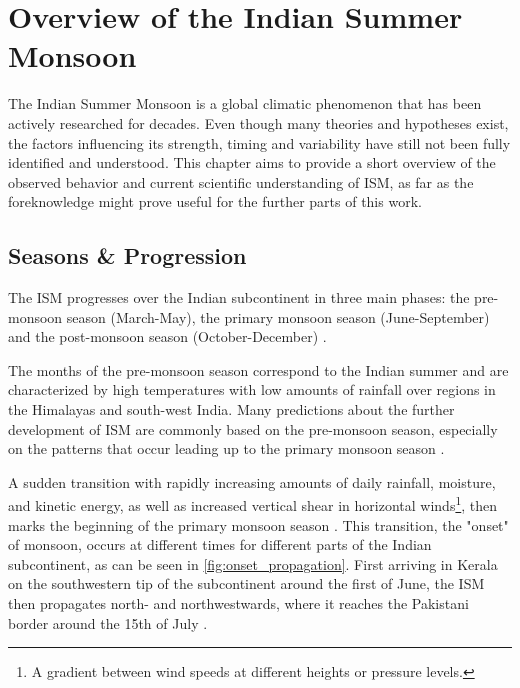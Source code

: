 \chapter{Overview of the Indian Summer Monsoon}
\label{c:ism_overview}
The Indian Summer Monsoon is a global climatic phenomenon that has been actively researched for decades. Even though many theories and hypotheses exist, the factors influencing its strength, timing and variability have still not been fully identified and understood. This chapter aims to provide a short overview of the observed behavior and current scientific understanding of ISM, as far as the foreknowledge might prove useful for the further parts of this work.


\section{Seasons \& Progression}
\label{st:ism_seasons}
The ISM progresses over the Indian subcontinent in three main phases: the pre-monsoon season (March-May), the primary monsoon season (June-September) and the post-monsoon season (October-December) \citep{Stolbova.2015}.

The months of the pre-monsoon season correspond to the Indian summer and are characterized by high temperatures with low amounts of rainfall over regions in the Himalayas and south-west India. Many predictions about the further development of ISM are commonly based on the pre-monsoon season, especially on the patterns that occur leading up to the primary monsoon season \citep{Stolbova.2015}.

A sudden transition with rapidly increasing amounts of daily rainfall, moisture, and kinetic energy, as well as increased vertical shear in horizontal winds\footnote{A gradient between wind speeds at different heights or pressure levels.}, then marks the beginning of the primary monsoon season \citep{Pradhan.2017}. This transition, the "onset" of monsoon, occurs at different times for different parts of the Indian subcontinent, as can be seen in \cref{fig:onset_propagation}. First arriving in Kerala on the southwestern tip of the subcontinent around the first of June, the ISM then propagates north- and northwestwards, where it reaches the Pakistani border around the 15th of July \citep{Willetts.2017}.

